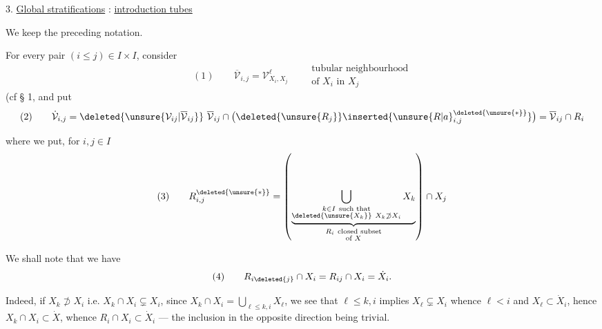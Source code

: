 3. \uline{Global stratifications} : \uline{introduction  tubes}

We keep the preceding notation.

For every pair $(i\leq j)\in I\times I$, consider
\[
(1)\qquad \overline{\mathcal V}_{i,j}=\mathcal V^{\ell}_{X_i,X_j}\qquad
\begin{gathered}\text{tubular neighbourhood}\\\text{of }X_i\text{ in }X_j\end{gathered}
\]
(cf § 1\unsure{)}, and put
\[
(2)\qquad\dot{\mathcal V}_{i,j}=\deleted{\unsure{\mathcal V_{ij}|\overline{\mathcal V}_{ij}}}\ \overline{\mathcal V}_{ij}\cap\bigl(\deleted{\unsure{R_j}}\inserted{\unsure{R|a}_{i,j}^{\deleted{\unsure{*}}}}\bigr)=\overline{\mathcal V}_{ij}\cap R_i
\]

where we put, for $i,j\in I$
\[
(3)\qquad R_{i,j}^{\deleted{\unsure{*}}}=\left(
\underbrace{\bigcup_{\substack{k\in I\ \text{such that}\\\deleted{\unsure{X_k}}\ X_k\not\supset X_i}}X_k}_{\substack{R_i\ \text{closed subset}\\\text{of }X}}
\right)\cap X_j
\]


We shall note that we have
\[
(4)\qquad R_{i\deleted{j}}\cap X_i=R_{ij}\cap X_i=\dot X_i.
\]

Indeed, if $X_k\not\supset X_i$ i.e. $X_k\cap X_i\subsetneq X_i$, since $X_k\cap X_i=\bigcup_{\ell\leq k,i}X_\ell$, we see that  $\ell\leq k,i$ implies $X_\ell\subsetneq X_i$ whence $\ell<i$ and $X_\ell\subset\dot X_i$, hence $X_k\cap X_i\subset\dot X$, whence $R_i\cap X_i\subset\dot X_i$ — the inclusion in the opposite direction being trivial.
